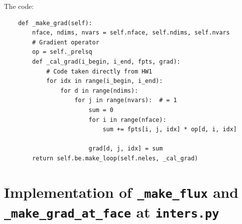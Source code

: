 \documentclass[a4paper, 12pt]{article}
\begin{document}
The code:
\begin{verbatim}
    def _make_grad(self):
        nface, ndims, nvars = self.nface, self.ndims, self.nvars
        # Gradient operator 
        op = self._prelsq
        def _cal_grad(i_begin, i_end, fpts, grad):
            # Code taken directly from HW1
            for idx in range(i_begin, i_end):
                for d in range(ndims):
                    for j in range(nvars):  # = 1
                        sum = 0
                        for i in range(nface):
                            sum += fpts[i, j, idx] * op[d, i, idx]

                        grad[d, j, idx] = sum
        return self.be.make_loop(self.neles, _cal_grad)   
\end{verbatim}

\section{Implementation of \texttt{\_make\_flux} and \texttt{\_make\_grad\_at\_face} at \texttt{inters.py}}
\end{document}
